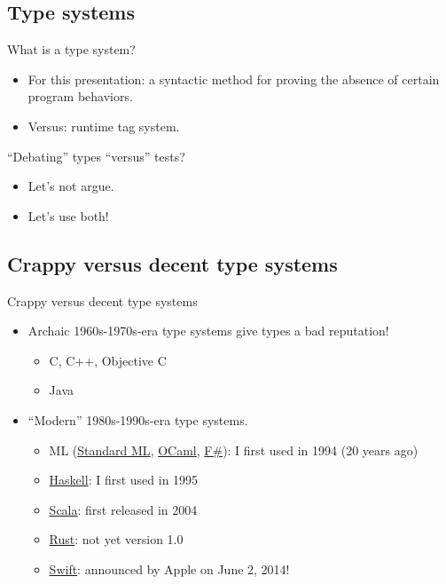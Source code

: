 \subsection{Type systems}

\begin{frame}{What is a type system?}
  \begin{itemize}
  \item For this presentation: a \alert{syntactic} method for \alert{proving} the absence of certain program behaviors.
  \item Versus: runtime tag system.
  \end{itemize}

  ``Debating'' types ``versus'' tests?
  \begin{itemize}
  \item Let's not argue.
  \item Let's use both!
  \end{itemize}
\end{frame}

\subsection{Crappy versus decent type systems}

\begin{frame}{Crappy versus decent type systems}
  \begin{itemize}
  \item Archaic \alert{1960s-1970s}-era type systems give types a bad reputation!
    \begin{itemize}
    \item C, C++, Objective C
    \item Java
    \end{itemize}
  \item ``Modern'' \alert{1980s-1990s}-era type systems.
    \begin{itemize}
    \item ML (\href{http://www.smlnj.org/}{Standard ML}, \href{http://ocaml.org/}{OCaml}, \href{http://fsharp.org/}{F\#}): I first used in 1994 (20 years ago)
    \item \href{http://www.haskell.org/}{Haskell}: I first used in 1995
    \item \href{http://www.scala-lang.org/}{Scala}: first released in 2004
    \item \href{http://www.rust-lang.org/}{Rust}: not yet version 1.0
    \item \href{http://developer.apple.com/swift/}{Swift}: announced by Apple on June 2, 2014!
    \end{itemize}
  \end{itemize}
\end{frame}

